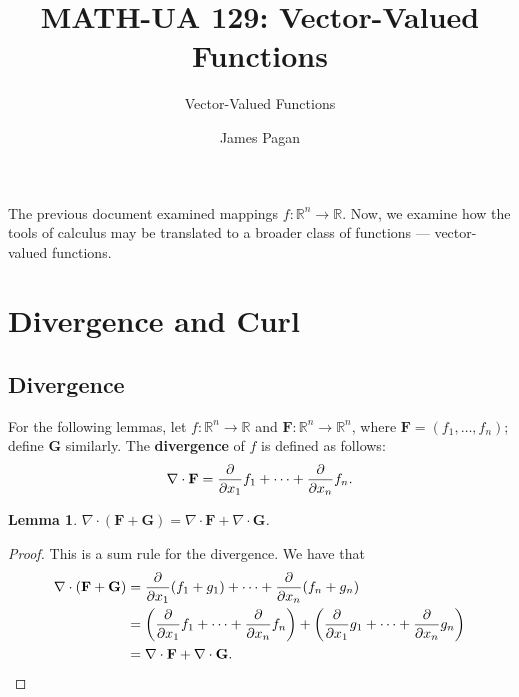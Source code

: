 \documentclass[11pt]{article}
\title{MATH-UA 129: Vector-Valued Functions}
\author{Vector-Valued Functions}
\date{James Pagan}
\newtheorem*{lemma*}{Lemma}
\renewcommand{\div}{\nabla \cdot}
\begin{document}
\maketitle
\tableofcontents

\abstract

The previous document examined mappings $f : \mathbb{R}^{n} \to \mathbb{R}$. Now, we examine how the tools of calculus may be translated to a broader class of functions --- vector-valued functions.

\newpage


\section{Divergence and Curl}


\subsection{Divergence}

For the following lemmas, let $f : \mathbb{R}^{n} \to \mathbb{R}$ and $\mathbf{F}: \mathbb{R}^{n} \to \mathbb{R}^{n}$, where $\mathbf{F} = (f_{1}, \ldots, f_{n})$; define $\mathbf{G}$ similarly. The \textbf{divergence} of $f$ is defined as follows:
\[
	\div \mathbf{F} = \pdv{x_{1}} f_{1} + \cdots + \pdv{x_{n}} f_{n}.
\]


\begin{lemma*}
	$\div (\mathbf{F} + \mathbf{G}) = \div \mathbf{F} + \div \mathbf{G}$.
\end{lemma*}
\begin{adjustwidth}{0.7cm}{}
    \begin{proof}\renewcommand{\qedsymbol}{}
		This is a sum rule for the divergence. We have that
		\begin{align*}
			\div (\mathbf{F} + \mathbf{G}) &= \pdv{x_{1}} (f_{1} + g_{1}) + \cdots + \pdv{x_{n}} (f_{n} + g_{n}) \\
			&= \left( \pdv{x_{1}} f_{1} + \cdots + \pdv{x_{n}} f_{n} \right) + \left( \pdv{x_{1}} g_{1} + \cdots + \pdv{x_{n}} g_{n} \right) \\
			&= \div \mathbf{F} + \div \mathbf{G}.
		\end{align*}
	\end{proof}
\end{adjustwidth}
\end{document}
